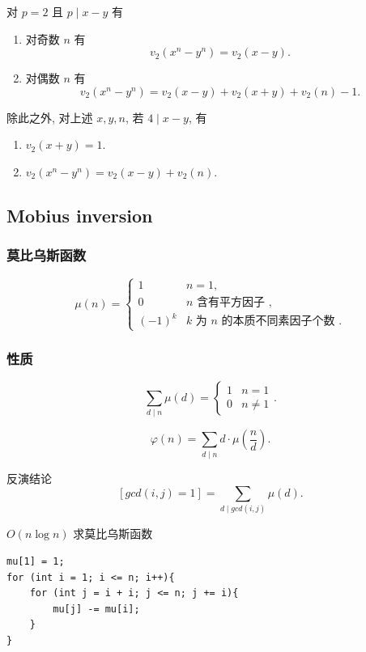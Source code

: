 \documentclass[UTF8, a4paper, titlepage, twoside]{ctexart}
\begin{document}
对 \(p = 2\) 且 \(p \mid x - y\) 有
\begin{enumerate}
    \item 对奇数 \(n\) 有
        \[
            v_2(x^n - y^n) = v_2(x - y).
        \]
    \item 对偶数 \(n\) 有
        \[
            v_2(x^n - y^n) = v_2(x - y) + v_2(x + y) + v_2(n) - 1.
        \]
\end{enumerate}

除此之外, 对上述 \(x, y, n\), 若 \(4 \mid x - y\), 有
\begin{enumerate}
    \item \(v_2(x + y) = 1.\)
    \item \(v_2(x^n - y^n) = v_2(x - y) + v_2(n).\)
\end{enumerate}

\subsection{ Mobius inversion}

\subsubsection*{ 莫比乌斯函数 }

\[
\mu(n) = 
\begin{cases}
    1 & n = 1, \\
    0 & n \text{ 含有平方因子\ }, \\
    (-1)^k & k \text{ 为\ } n \text{ 的本质不同素因子个数\ }.
\end{cases}
\]

\subsubsection*{ 性质 }

\[
\sum_{d \mid n} \mu(d) = \begin{cases} 1 & n = 1 \\ 0 & n \neq 1 \end{cases}.
\]

\[
\varphi(n) = \sum_{d \mid n} d \cdot \mu(\frac{n}{d}).
\]

反演结论
\[
[gcd(i, j) = 1] = \sum_{d \mid gcd(i, j)} \mu(d).
\]

\(O(n \log n)\) 求莫比乌斯函数

\begin{lstlisting}[style=cpp]
mu[1] = 1;
for (int i = 1; i <= n; i++){
    for (int j = i + i; j <= n; j += i){
        mu[j] -= mu[i];
    }
}
\end{lstlisting}
\end{document}
